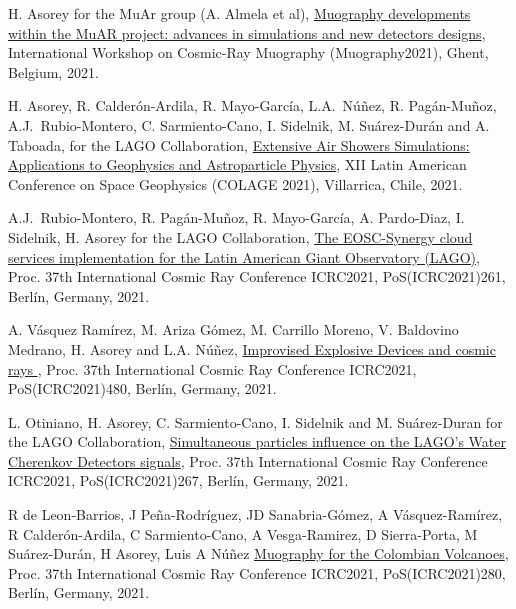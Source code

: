 \begin{etaremune}
\item {} H. Asorey for the MuAr group (A. Almela et al), \href{https://indico.cern.ch/event/1033631/contributions/4530674/}{Muography developments within the MuAR project: advances in simulations and new detectors designs}, \en International Workshop on Cosmic-Ray Muography (Muography2021), Ghent, Belgium, 2021.

\item {} H. Asorey, R. Calderón-Ardila, R. Mayo-García, L.A.\ Núñez, R. Pagán-Muñoz, A.J.\ Rubio-Montero, C. Sarmiento-Cano, I. Sidelnik, M. Suárez-Durán and A. Taboada, for the LAGO Collaboration, \href{https://ccc.ciencias.uchile.cl/2021colage/abstracts/Hern%C3%A1n%20Asorey.pdf}{Extensive Air Showers Simulations: Applications to Geophysics and Astroparticle Physics}, \en XII Latin American Conference on Space Geophysics (COLAGE 2021), Villarrica, Chile, 2021.

\item {} A.J.\ Rubio-Montero, R. Pagán-Muñoz, R. Mayo-García, A. Pardo-Diaz, I. Sidelnik, H. Asorey for the LAGO Collaboration, \href{https://doi.org/10.22323/1.395.0261}{The EOSC-Synergy cloud services implementation for the Latin American Giant Observatory (LAGO)}, \en Proc.
37th International Cosmic Ray Conference ICRC2021, PoS(ICRC2021)261, Berlín, Germany, 2021.

\item {} A. Vásquez Ramírez, M. Ariza Gómez, M. Carrillo Moreno, V. Baldovino Medrano, H. Asorey and L.A. Núñez, \href{https://doi.org/10.22323/1.395.0480}{Improvised Explosive Devices and cosmic rays
}, \en Proc. 37th International Cosmic Ray Conference ICRC2021, PoS(ICRC2021)480, Berlín, Germany, 2021.

\item {} L. Otiniano, H. Asorey, C. Sarmiento-Cano, I. Sidelnik and M. Suárez-Duran for the LAGO Collaboration, \href{https://doi.org/10.22323/1.395.0267}{Simultaneous particles influence on the LAGO’s Water Cherenkov Detectors signals}, \en Proc. 37th International Cosmic Ray Conference ICRC2021, PoS(ICRC2021)267, Berlín, Germany, 2021.

\item {} R de Leon-Barrios, J Peña-Rodríguez, JD Sanabria-Gómez, A Vásquez-Ramírez, R Calderón-Ardila, C Sarmiento-Cano, A Vesga-Ramirez, D Sierra-Porta, M Suárez-Durán, H Asorey, Luis A Núñez \href{https://doi.org/10.22323/1.395.0280}{Muography for the Colombian Volcanoes}, \en Proc.
37th International Cosmic Ray Conference ICRC2021, PoS(ICRC2021)280, Berlín, Germany, 2021.


\end{etaremune}
